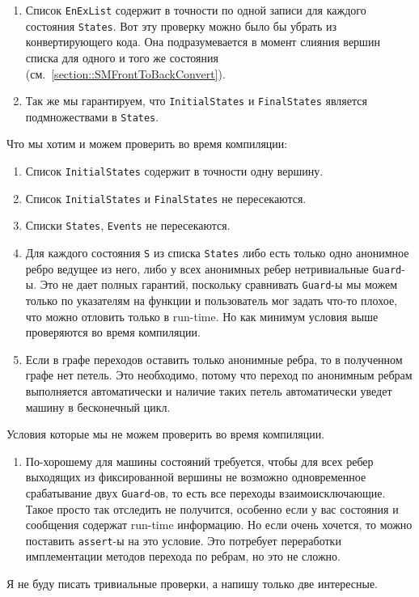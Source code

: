 \documentclass{article}
\begin{document}
{\begin{enumerate}
\item Список \verb"EnExList" содержит в точности по одной записи для каждого состояния \verb"States".
Вот эту проверку можно было бы убрать из конвертирующего кода.
Она подразумевается в момент слияния вершин списка для одного и того же состояния (см.~\ref{section::SMFrontToBackConvert}).

\item Так же мы гарантируем, что \verb"InitialStates" и \verb"FinalStates" является подмножествами в \verb"States".
\end{enumerate}
Что мы хотим и можем проверить во время компиляции:
\begin{enumerate}
\item Список \verb"InitialStates" содержит в точности одну вершину.

\item Список \verb"InitialStates" и \verb"FinalStates" не пересекаются.

\item Списки \verb"States", \verb"Events" не пересекаются.

\item Для каждого состояния \verb"S" из списка \verb"States" либо есть только одно анонимное ребро ведущее из него, либо  у всех анонимных ребер нетривиальные \verb"Guard"-ы.
Это не дает полных гарантий, поскольку сравнивать \verb"Guard"-ы мы можем только по указателям на функции и пользователь мог задать что-то плохое, что можно отловить только в run-time.
Но как минимум условия выше проверяются во время компиляции.

\item Если в графе переходов оставить только анонимные ребра, то в полученном графе нет петель.
Это необходимо, потому что переход по анонимным ребрам выполняется автоматически и наличие таких петель автоматически уведет машину в бесконечный цикл.
\end{enumerate}
Условия которые мы не можем проверить во время компиляции.
\begin{enumerate}
\item По-хорошему для машины состояний требуется, чтобы для всех ребер выходящих из фиксированной вершины не возможно одновременное срабатывание двух \verb"Guard"-ов, то есть все переходы взаимоисключающие.
Такое просто так отследить не получится, особенно если у вас состояния и сообщения содержат run-time информацию.
Но если очень хочется, то можно поставить \verb"assert"-ы на это условие.
Это потребует переработки имплементации методов перехода по ребрам, но это не сложно.
\end{enumerate}
Я не буду писать тривиальные проверки, а напишу только две интересные.

}
\end{document}
